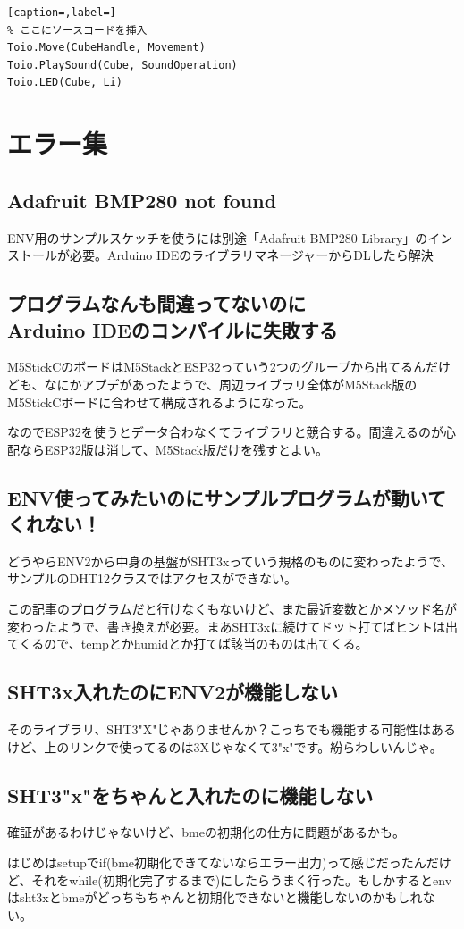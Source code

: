\documentclass[fleqn,twocolumn]{mynote}
\begin{document}
\begin{lstlisting}[caption=,label=]
% ここにソースコードを挿入
Toio.Move(CubeHandle, Movement)
Toio.PlaySound(Cube, SoundOperation)
Toio.LED(Cube, Li)
\end{lstlisting}

\section*{エラー集}
\subsection*{Adafruit BMP280 not found}
ENV用のサンプルスケッチを使うには別途「Adafruit BMP280 Library」のインストールが必要。Arduino IDEのライブラリマネージャーからDLしたら解決

\subsection*{プログラムなんも間違ってないのに\\Arduino IDEのコンパイルに失敗する}
M5StickCのボードはM5StackとESP32っていう2つのグループから出てるんだけども、なにかアプデがあったようで、周辺ライブラリ全体がM5Stack版のM5StickCボードに合わせて構成されるようになった。

なのでESP32を使うとデータ合わなくてライブラリと競合する。間違えるのが心配ならESP32版は消して、M5Stack版だけを残すとよい。

\subsection*{ENV使ってみたいのにサンプルプログラムが動いてくれない！}
どうやらENV2から中身の基盤がSHT3xっていう規格のものに変わったようで、サンプルのDHT12クラスではアクセスができない。

\href{https://qiita.com/visyeii/items/e28f8500f43166710664}{この記事}のプログラムだと行けなくもないけど、また最近変数とかメソッド名が変わったようで、書き換えが必要。まあSHT3xに続けてドット打てばヒントは出てくるので、tempとかhumidとか打てば該当のものは出てくる。

\subsection*{SHT3x入れたのにENV2が機能しない}
そのライブラリ、SHT3"X"じゃありませんか？こっちでも機能する可能性はあるけど、上のリンクで使ってるのは3Xじゃなくて3"x"です。紛らわしいんじゃ。

\subsection*{SHT3"x"をちゃんと入れたのに機能しない}
確証があるわけじゃないけど、bmeの初期化の仕方に問題があるかも。

はじめはsetupでif(bme初期化できてないならエラー出力)って感じだったんだけど、それをwhile(初期化完了するまで)にしたらうまく行った。もしかするとenvはsht3xとbmeがどっちもちゃんと初期化できないと機能しないのかもしれない。



\end{document}
